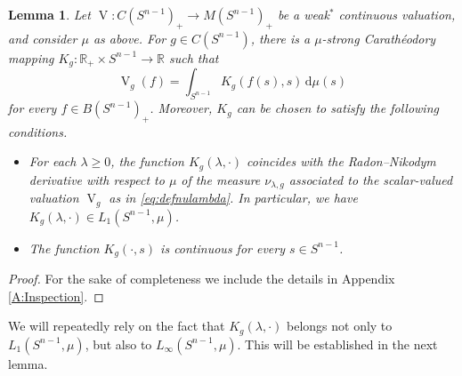 \documentclass[11pt, a4paper]{amsart}
\newtheorem{lemma}[proposition]{Lemma}
\renewcommand{\d}{\,\mathrm{d}}
\newcommand{\rp}{\mathbb R_{\scriptscriptstyle +}}
\newcommand{\sn}{{S^{n-1}}}
\renewcommand{\d}{\,\mathrm{d}}
\newcommand{\oV}{\operatorname{V}}
\newcommand{\bfn}{B(\sn )_{\scriptscriptstyle +}}
\newcommand{\R}{\mathbb R}
\begin{document}
\begin{lemma}\label{l:weak pseudokernel}
Let $\oV\colon C(S^{n-1})_+\rightarrow M(S^{n-1})_{\scriptscriptstyle +}$ be a weak$^*$ continuous valuation, and consider $\mu$ as above. For $g\in C(\sn)$, there is a $\mu$-strong Carath\'eodory mapping $K_g\colon \rp\times \sn \to \R$ such that
$$\oV_g(f)= \int_{\sn } K_g(f(s), s) \d\mu(s)$$
for every $f\in \bfn$. Moreover, $K_g$ can be chosen to satisfy the following conditions.
\begin{itemize}
    \item For each $\lambda\ge 0$, the function $K_g(\lambda,\cdot)$ coincides with the Radon--Nikodym derivative with respect to $\mu$ of the measure $\nu_{\lambda,g}$ associated to the scalar-valued valuation $\oV_g$ as in \eqref{eq:defnulambda}. In particular, we have $K_g(\lambda, \cdot)\in L_1(\sn,\mu)$.
    \item The function $K_g(\cdot,s)$ is continuous for every $s\in \sn $.
\end{itemize}
\end{lemma} 
\begin{proof}
For the sake of completeness we include the details in Appendix \ref{A:Inspection}.
\end{proof}




We will repeatedly rely on the fact that $K_g(\lambda, \cdot)$ belongs not only to $L_1(\sn,\mu)$, but also to $L_{\scriptscriptstyle \infty}(\sn,\mu)$. This will be established in the next lemma. 
\end{document}

